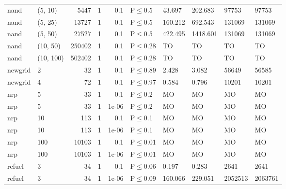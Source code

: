 \begin{longtable}{llrrrlllll}
 nand          & (5, 10)   &   	5447 & 1 & 0.1   & P$\leq$0.5   & 43.697  & 202.683  & 97753   & 97753   \\
 nand          & (5, 25)   &  	13727 & 1 & 0.1   & P$\leq$0.5   & 160.212 & 692.543  & 131069  & 131069  \\
 nand          & (5, 50)   &  	27527 & 1 & 0.1   & P$\leq$0.5   & 422.495 & 1418.601 & 131069  & 131069  \\
 nand          & (10, 50)  & 	250402 & 1 & 0.1   & P$\leq$0.28  & TO      & TO       & TO      & TO      \\
 nand          & (10, 100) & 	502402 & 1 & 0.1   & P$\leq$0.28  & TO      & TO       & TO      & TO      \\
 newgrid       & 2         &     	32 & 1 & 0.1   & P$\leq$0.89  & 2.428   & 3.082    & 56649   & 56585   \\
 newgrid       & 4         &     	72 & 1 & 0.1   & P$\leq$0.97  & 0.584   & 0.796    & 10201   & 10201   \\
 nrp           & 5         &     	33 & 1 & 0.1   & P$\leq$0.2   & MO      & MO       & MO      & MO      \\
 nrp           & 5         &     	33 & 1 & 1e-06 & P$\leq$0.2   & MO      & MO       & MO      & MO      \\
 nrp           & 10        &    	113 & 1 & 0.1   & P$\leq$0.1   & MO      & MO       & MO      & MO      \\
 nrp           & 10        &    	113 & 1 & 1e-06 & P$\leq$0.1   & MO      & MO       & MO      & MO      \\
 nrp           & 100       &  	10103 & 1 & 0.1   & P$\leq$0.01  & MO      & MO       & MO      & MO      \\
 nrp           & 100       &  	10103 & 1 & 1e-06 & P$\leq$0.01  & MO      & MO       & MO      & MO      \\
 refuel        & 3         &     	34 & 1 & 0.1   & P$\leq$0.06  & 0.197   & 0.283    & 2641    & 2641    \\
 refuel        & 3         &     	34 & 1 & 1e-06 & P$\leq$0.09  & 160.066 & 229.051  & 2052513 & 2063761 \\
\bottomrule
\end{longtable}
